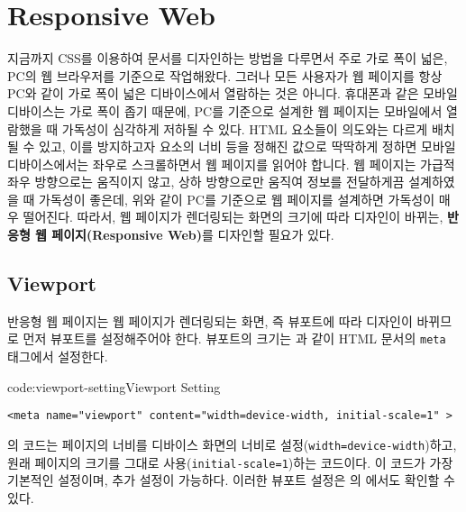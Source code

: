 \section{Responsive Web} \label{sect:responsive-web}

지금까지 CSS를 이용하여 문서를 디자인하는 방법을 다루면서 주로 가로 폭이 넓은, PC의 웹 브라우저를 기준으로 작업해왔다. 그러나 모든 사용자가 웹 페이지를 항상 PC와 같이 가로 폭이 넓은 디바이스에서 열람하는 것은 아니다. 휴대폰과 같은 모바일 디바이스는 가로 폭이 좁기 때문에, PC를 기준으로 설계한 웹 페이지는 모바일에서 열람했을 때 가독성이 심각하게 저하될 수 있다. HTML 요소들이 의도와는 다르게 배치될 수 있고, 이를 방지하고자 요소의 너비 등을 정해진 값으로 딱딱하게 정하면 모바일 디바이스에서는 좌우로 스크롤하면서 웹 페이지를 읽어야 합니다. 웹 페이지는 가급적 좌우 방향으로는 움직이지 않고, 상하 방향으로만 움직여 정보를 전달하게끔 설계하였을 때 가독성이 좋은데, 위와 같이 PC를 기준으로 웹 페이지를 설계하면 가독성이 매우 떨어진다. 따라서, 웹 페이지가 렌더링되는 화면의 크기에 따라 디자인이 바뀌는, \textbf{반응형 웹 페이지(Responsive Web)}를 디자인할 필요가 있다.


\subsection*{Viewport}
반응형 웹 페이지는 웹 페이지가 렌더링되는 화면, 즉 뷰포트에 따라 디자인이 바뀌므로 먼저 뷰포트를 설정해주어야 한다. 뷰포트의 크기는 과 같이 HTML 문서의 \texttt{meta} 태그에서 설정한다.

\begin{codeenv}{code:viewport-setting}{Viewport Setting}\begin{verbatim}
<meta name="viewport" content="width=device-width, initial-scale=1" >
\end{verbatim}
\end{codeenv}

의 코드는 페이지의 너비를 디바이스 화면의 너비로 설정(\texttt{width=device-width})하고, 원래 페이지의 크기를 그대로 사용(\texttt{initial-scale=1})하는 코드이다. 이 코드가 가장 기본적인 설정이며, 추가 설정이 가능하다. 이러한 뷰포트 설정은 의 에서도 확인할 수 있다.


